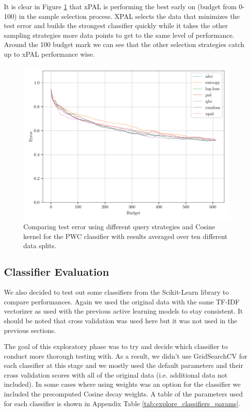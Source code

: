 It is clear in Figure \ref{fig:cos_avg_test_results} that xPAL is performing the best early on (budget from 0-100) in the sample selection process. XPAL selects the data that minimizes the test error and builds the strongest classifier quickly while it takes the other sampling strategies more data points to get to the same level of performance. Around the 100 budget mark we can see that the other selection strategies catch up to xPAL performance wise.

\begin{figure}[ht]
    \centering
    \includegraphics[width=\scale\textwidth]{../img/plot_kernel_cos_averaged_test_results.pdf}
    \caption{Comparing test error using different query strategies and Cosine kernel for the PWC classifier with results averaged over ten different data splits.}
    \label{fig:cos_avg_test_results}
\end{figure}


\subsection{Classifier Evaluation}

We also decided to test out some classifiers from the Scikit-Learn library to compare performances. Again we used the original data with the same TF-IDF vectorizer as used with the previous active learning models to stay consistent. It should be noted that cross validation was used here but it was not used in the previous sections.

The goal of this exploratory phase was to try and decide which classifier to conduct more thorough testing with. As a result, we didn't use GridSearchCV for each classifier at this stage and we mostly used the default parameters and their cross validation scores with all of the original data (i.e. additional data not included). In some cases where using weights was an option for the classifier we included the precomputed Cosine decay weights. A table of the parameters used for each classifier is shown in Appendix Table \ref{tab:explore_classifiers_params}.

